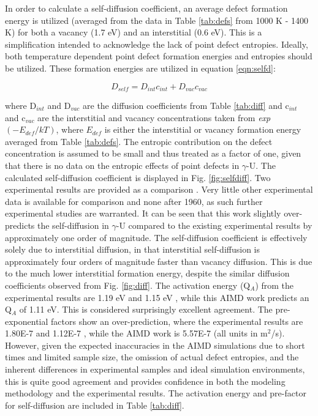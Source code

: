 \documentclass[review]{elsarticle}
\begin{document}
In order to calculate a self-diffusion coefficient, an average defect formation energy is utilized (averaged from the data in Table \ref{tab:defs} from 1000 K - 1400 K) for both a vacancy (1.7 eV) and an interstitial (0.6 eV). This is a simplification intended to acknowledge the lack of point defect entropies. Ideally, both temperature dependent point defect formation energies and entropies should be utilized. These formation energies are utilized in equation \ref{eqn:selfd}:

\begin{equation}
\label{eqn:selfd}
D_{self} = D_{int}c_{int} + D_{vac}c_{vac}
\end{equation} 

where D$_{int}$ and D$_{vac}$ are the diffusion coefficients from Table \ref{tab:diff} and c$_{int}$ and c$_{vac}$ are the interstitial and vacancy concentrations taken from \textit{exp}$(-E_{def}/kT)$, where $E_{def}$ is either the interstitial or vacancy formation energy averaged from Table \ref{tab:defs}. The entropic contribution on the defect concentration is assumed to be small and thus treated as a factor of one, given that there is no data on the entropic effects of point defects in $\gamma$-U. The calculated self-diffusion coefficient is displayed in Fig. \ref{fig:selfdiff}. Two experimental results are provided as a comparison \cite{rothman1959,adda1959}. Very little other experimental data is available for comparison and none after 1960, as such further experimental studies are warranted. It can be seen that this work slightly over-predicts the self-diffusion in $\gamma$-U compared to the existing experimental results by approximately one order of magnitude. The self-diffusion coefficient is effectively solely due to interstitial diffusion, in that interstitial self-diffusion is approximately four orders of magnitude faster than vacancy diffusion. This is due to the much lower interstitial formation energy, despite the similar diffusion coefficients observed from Fig. \ref{fig:diff}. The activation energy (Q$_A$) from the experimental results are 1.19 eV \cite{adda1959} and 1.15 eV \cite{rothman1959}, while this AIMD work predicts an Q$_A$ of 1.11 eV. This is considered surprisingly excellent agreement. The pre-exponential factors show an over-prediction, where the experimental results are 1.80E-7 \cite{adda1959} and 1.12E-7 \cite{rothman1959}, while the AIMD work is 5.57E-7 (all units in m$^2$/s). However, given the expected inaccuracies in the AIMD simulations due to short times and limited sample size, the omission of actual defect entropies, and the inherent differences in experimental samples and ideal simulation environments, this is quite good agreement and provides confidence in both the modeling methodology and the experimental results. The activation energy and pre-factor for self-diffusion are included in Table \ref{tab:diff}.
\end{document}
